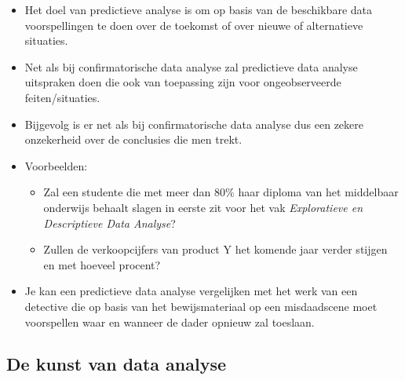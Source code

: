 \documentclass[]{tufte-book}
\providecommand{\tightlist}{%
  \setlength{\itemsep}{0pt}\setlength{\parskip}{0pt}}
\begin{document}
\begin{itemize}
\tightlist
\item
  Het doel van predictieve analyse is om op basis van de beschikbare data voorspellingen te doen over de toekomst of over nieuwe of alternatieve situaties.
\item
  Net als bij confirmatorische data analyse zal predictieve data analyse uitspraken doen die ook van toepassing zijn voor ongeobserveerde feiten/situaties.
\item
  Bijgevolg is er net als bij confirmatorische data analyse dus een zekere onzekerheid over de conclusies die men trekt.
\item
  Voorbeelden:

  \begin{itemize}
  \tightlist
  \item
    Zal een studente die met meer dan 80\% haar diploma van het middelbaar onderwijs behaalt slagen in eerste zit voor het vak \emph{Exploratieve en Descriptieve Data Analyse}?
  \item
    Zullen de verkoopcijfers van product Y het komende jaar verder stijgen en met hoeveel procent?
  \end{itemize}
\item
  Je kan een predictieve data analyse vergelijken met het werk van een detective die op basis van het bewijsmateriaal op een misdaadscene moet voorspellen waar en wanneer de dader opnieuw zal toeslaan.
\end{itemize}

\hypertarget{de-kunst-van-data-analyse}{%
\subsection{De kunst van data analyse}\label{de-kunst-van-data-analyse}}
\end{document}
